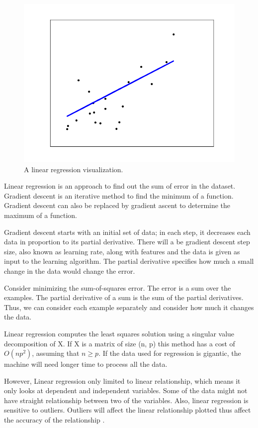 \documentclass[journal]{IEEEtran}
\begin{document}
\begin{figure}[!ht]
	\centering
	\includegraphics[scale=0.2]{linear}
	\caption{A linear regression visualization.}
\end{figure}

Linear regression is an approach to find out the sum of error in the dataset. Gradient descent is an iterative method to find the minimum of a function. Gradient descent can also be replaced by gradient ascent to determine the maximum of a function.

Gradient descent starts with an initial set of data; in each step, it decreases each data in proportion to its partial derivative. There will a be gradient descent step size, also known as learning rate, along with features and the data is given as input to the learning algorithm. The partial derivative specifies how much a small change in the data would change the error. 

Consider minimizing the sum-of-squares error. The error is a sum over the examples. The partial derivative of a sum is the sum of the partial derivatives. Thus, we can consider each example separately and consider how much it changes the data.

Linear regression computes the least squares solution using a singular value decomposition of X. If X is a matrix of size (n, p) this method has a cost of $O\left(n{p}^{2}\right)$, assuming that $n\ge p$. If the data used for regression is gigantic, the machine will need longer time to process all the data. 

However, Linear regression only limited to linear relationship, which means it only looks at dependent and independent variables. Some of the data might not have straight relationship between two of the variables. Also, linear regression is sensitive to outliers. Outliers will affect the linear relationship plotted thus affect the accuracy of the relationship \cite{Sciencing2017-qw}.
\end{document}
